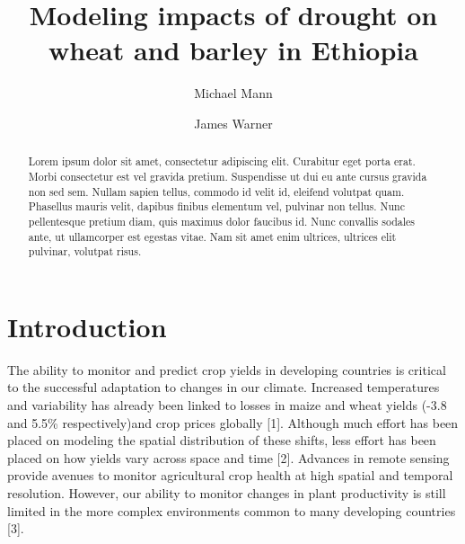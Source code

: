 \documentclass[]{elsarticle} %
\begin{document}
\begin{frontmatter}

  \title{Modeling impacts of drought on wheat and barley in Ethiopia}
    \author[The George Washington University]{Michael Mann}
  
    \author[International Food Policy Research Institute]{James Warner}
  
      \address[The George Washington University]{Department of Geography, Street, Washington, DC 20052}
    \address[IFPRI]{Department, Street, Addis Abbaba, Ethiopia}
  
  \begin{abstract}
  Lorem ipsum dolor sit amet, consectetur adipiscing elit. Curabitur eget
  porta erat. Morbi consectetur est vel gravida pretium. Suspendisse ut
  dui eu ante cursus gravida non sed sem. Nullam sapien tellus, commodo id
  velit id, eleifend volutpat quam. Phasellus mauris velit, dapibus
  finibus elementum vel, pulvinar non tellus. Nunc pellentesque pretium
  diam, quis maximus dolor faucibus id. Nunc convallis sodales ante, ut
  ullamcorper est egestas vitae. Nam sit amet enim ultrices, ultrices elit
  pulvinar, volutpat risus.
  \end{abstract}
  
 \end{frontmatter}

\section{Introduction}\label{introduction}

The ability to monitor and predict crop yields in developing countries
is critical to the successful adaptation to changes in our climate.
Increased temperatures and variability has already been linked to losses
in maize and wheat yields (-3.8 and 5.5\% respectively)and crop prices
globally {[}1{]}. Although much effort has been placed on modeling the
spatial distribution of these shifts, less effort has been placed on how
yields vary across space and time {[}2{]}. Advances in remote sensing
provide avenues to monitor agricultural crop health at high spatial and
temporal resolution. However, our ability to monitor changes in plant
productivity is still limited in the more complex environments common to
many developing countries {[}3{]}.
\end{document}
